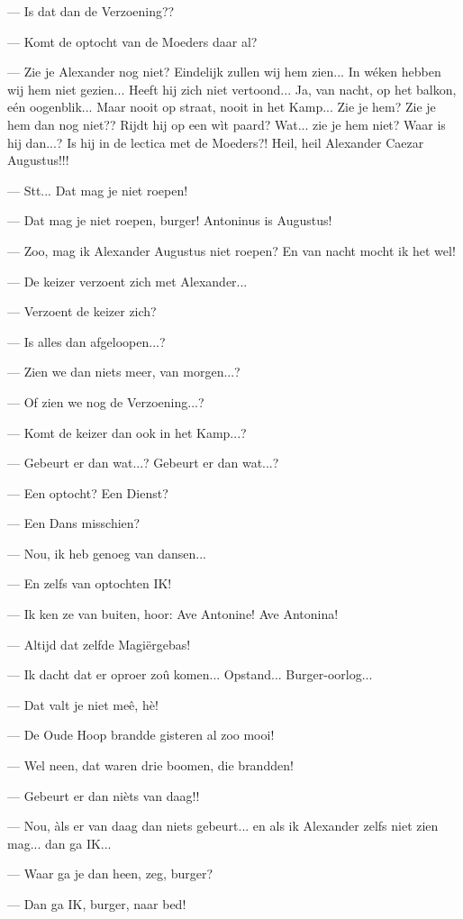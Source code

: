 \documentclass[a4paper, 12pt, oneside, dutch]{article}
\begin{document}
--- Is dat dan de Verzoening??

--- Komt de optocht van de Moeders daar al?

--- Zie je Alexander nog niet? Eindelijk zullen wij hem zien... In wéken hebben wij hem niet gezien... Heeft hij zich niet vertoond... Ja, van nacht, op het balkon, eén oogenblik... Maar nooit op straat, nooit in het Kamp... Zie je hem? Zie je hem dan nog niet?? Rijdt hij op een wìt paard? Wat... zie je hem niet? Waar is hij dan...? Is hij in de lectica met de Moeders?! Heil, heil Alexander Caezar Augustus!!!

--- Stt... Dat mag je niet roepen!

--- Dat mag je niet roepen, burger! Antoninus is Augustus!

--- Zoo, mag ik Alexander Augustus niet roepen? En van nacht mocht ik het wel!

--- De keizer verzoent zich met Alexander...

--- Verzoent de keizer zich?

--- Is alles dan afgeloopen...?

--- Zien we dan niets meer, van morgen...?

--- Of zien we nog de Verzoening...?

--- Komt de keizer dan ook in het Kamp...?

--- Gebeurt er dan wat...? Gebeurt er dan wat...?

--- Een optocht? Een Dienst?

--- Een Dans misschien?

--- Nou, ik heb genoeg van dansen...

--- En zelfs van optochten IK!

--- Ik ken ze van buiten, hoor: Ave Antonine! Ave Antonina!

--- Altijd dat zelfde Magiërgebas!

--- Ik dacht dat er oproer zoû komen... Opstand... Burger-oorlog...

--- Dat valt je niet meê, hè!

--- De Oude Hoop brandde gisteren al zoo mooi!

--- Wel neen, dat waren drie boomen, die brandden!

--- Gebeurt er dan nièts van daag!!

--- Nou, àls er van daag dan niets gebeurt... en als ik Alexander zelfs niet zien mag... dan ga IK...

--- Waar ga je dan heen, zeg, burger?

--- Dan ga IK, burger, naar bed!
\end{document}

